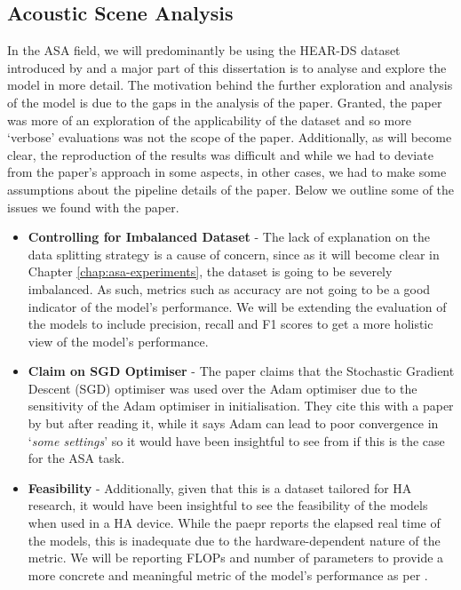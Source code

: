 \documentclass[logo,bsc,singlespacing,parskip,online]{infthesis}
\begin{document}
\subsection{Acoustic Scene Analysis}
In the ASA field, we will predominantly be using the HEAR-DS dataset introduced by \citet{Huwel2020HearDS}
and a major part of this dissertation is to analyse and explore the model in more detail.
The motivation behind the further exploration and analysis of the model is due 
to the gaps in the analysis of the paper. Granted, the paper was more of an exploration of the applicability of the dataset 
and so more `verbose' evaluations was not the scope of the paper. 
Additionally, as will become clear, the reproduction of the results 
was difficult and while we had to deviate from the paper's approach 
in some aspects, in other cases, we had to make some assumptions 
about the pipeline details of the paper. 
Below we outline some of the issues we found with the paper.
\begin{itemize}
   \item \textbf{Controlling for Imbalanced Dataset} - The lack of explanation on the data splitting strategy 
   is a cause of concern, since as it will become clear in Chapter \ref{chap:asa-experiments},
   the dataset is going to be severely imbalanced. As such, metrics such as accuracy are not going to be a good 
   indicator of the model's performance. We will be extending the evaluation of the models to include 
   precision, recall and F1 scores to get a more holistic view of the model's performance. 
   \item \textbf{Claim on SGD Optimiser} - The paper claims that the Stochastic Gradient Descent (SGD) 
   optimiser was used over the Adam optimiser due to the sensitivity of the Adam optimiser in 
   initialisation. They cite this with a paper by \citet{} 
   but after reading it, while it says 
   Adam can lead to poor convergence in `\textit{some settings}'
   so it would have been insightful to see from \citet{Huwel2020HearDS}
   if this is the case for the ASA task.
   \item \textbf{Feasibility} - Additionally, given that 
   this is a dataset tailored for HA research, it would have been insightful 
   to see the feasibility of the models when used in a HA device. While the paepr 
   reports the elapsed real time of the models, this 
   is inadequate due to the hardware-dependent nature of the metric. 
   We will be reporting FLOPs and number of parameters to provide a more 
   concrete and meaningful metric of the model's performance as per \citet{schwartz2019greenai}.
\end{itemize}
\end{document}
